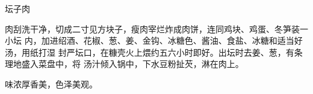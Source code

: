 %
%
%
%
%
%
%
\begin{recipe}{坛子肉}

\ingredients


\preparation

肉刮洗干净，切成二寸见方块子，瘦肉宰烂炸成肉饼，连同鸡块、鸡蛋、冬笋装一小坛
内，加进绍酒、花椒、葱、姜、金钩、冰糖色、酱油、食盐、冰糖和适当好汤，用纸打湿
封严坛口，在糠壳火上煨约五六小时即好。出坛时去姜、葱，有条理地盛入菜盘中，将
汤汁倾入锅中，下水豆粉扯芡，淋在肉上。

\features

味浓厚香美，色泽美观。

\end{recipe}

